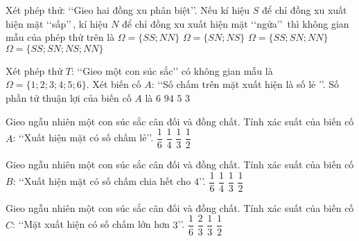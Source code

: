 \begin{ex}%
	Xét phép thử: \lq\lq  Gieo hai đồng xu phân biệt\rq\rq. Nếu kí hiệu $S$ để chỉ đồng xu xuất hiện mặt \lq\lq  sấp\rq\rq \,, kí hiệu $N$
	để chỉ đồng xu xuất hiện mặt \lq\lq  ngửa\rq\rq \, thì không gian mẫu của phép thử trên là
	\choice
	{$\Omega=\{SS;NN\}$}
	{ $\Omega=\{SN;NS\}$}
	{$\Omega=\{SS;SN;NN\}$}
	{\True $\Omega=\{SS;SN;NS;NN\}$}	
\end{ex}
\begin{ex}%
	Xét phép thử $T$: \lq\lq  Gieo một con súc sắc\rq\rq\; có không gian mẫu là $\Omega=\{1 ; 2 ; 3 ; 4 ; 5 ; 6\}$. Xét biến cố $A$: \lq\lq  Số chấm trên mặt xuất hiện là số lẻ \rq\rq.	Số phần tử thuận lợi của biến cố $A$ là
	\choice
	{$6$}
	{ $94$}
	{$5$}
	{\True $3$}	
\end{ex}
\begin{ex}%
	Gieo ngẫu nhiên một con súc sắc cân đối và đồng chất. Tính xác suất của biến cố $A$: \lq\lq  Xuất hiện mặt có số chấm lẻ\rq\rq.
	\choice
	{$\dfrac{1}{6}$}
	{ $\dfrac{1}{4}$}
	{$\dfrac{1}{3}$}
	{\True $\dfrac{1}{2}$}	
\end{ex}
\begin{ex}%
	Gieo ngẫu nhiên một con súc sắc cân đối và đồng chất. Tính xác suất của biến cố $B$: \lq\lq  Xuất hiện mặt có số chấm chia hết cho $4$\rq\rq.
	\choice
	{\True$\dfrac{1}{6}$}
	{ $\dfrac{1}{4}$}
	{$\dfrac{1}{3}$}
	{ $\dfrac{1}{2}$}	
\end{ex}
\begin{ex}%
	Gieo ngẫu nhiên một con súc sắc cân đối và đồng chất. Tính xác suất của biến cố $C$:  \lq\lq  Mặt xuất hiện có số chấm lớn hơn $3$\rq\rq.
	\choice
	{$\dfrac{1}{6}$}
	{ $\dfrac{2}{3}$}
	{$\dfrac{1}{3}$}
	{\True  $\dfrac{1}{2}$}	
\end{ex}


